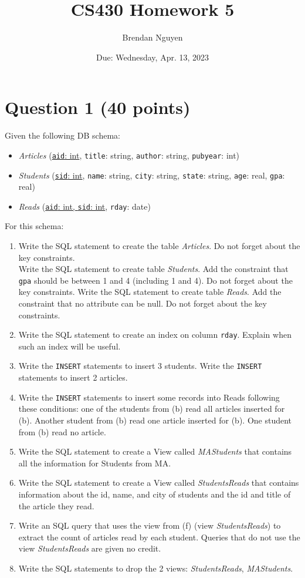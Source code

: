 \documentclass[letterpaper, 11pt]{article}
\title{CS430 Homework 5}
\author{Brendan Nguyen}
\date{Due: Wednesday, Apr. 13, 2023}
\begin{document}
\maketitle

\section*{Question 1 (40 points)}

Given the following DB schema:
\begin{itemize}
    \item \textit{Articles} (\underline{\texttt{aid}: int}, \texttt{title}: string, \texttt{author}: string, \texttt{pubyear}: int)
    \item \textit{Students} (\underline{\texttt{sid}: int}, \texttt{name}: string, \texttt{city}: string, \texttt{state}: string, \texttt{age}: real, \texttt{gpa}: real)
    \item \textit{Reads} (\underline{\texttt{aid}: int, \texttt{sid}: int}, \texttt{rday}: date)
\end{itemize}

For this schema:
\begin{enumerate}[label={\alph*})]
    \item Write the SQL statement to create the table \textit{Articles}. Do not forget about the key constraints.\\
    Write the SQL statement to create table \textit{Students}. Add the constraint that \texttt{gpa} should be between 1 and 4 (including 1 and 4). Do not forget about the key constraints. Write the SQL statement to create table \textit{Reads}. Add the constraint that no attribute can be null. Do not forget about the key constraints.
    \item Write the SQL statement to create an index on column \texttt{rday}. Explain when such an index will be useful.
    \item Write the \texttt{INSERT} statements to insert 3 students. Write the \texttt{INSERT} statements to insert 2 articles.
    \item Write the \texttt{INSERT} statements to insert some records into Reads following these conditions: one of the students from (b) read all articles inserted for (b). Another student from (b) read one article inserted for (b). One student from (b) read no article. 
    \item Write the SQL statement to create a View called \textit{MAStudents} that contains all the information for Students from MA.
    \item Write the SQL statement to create a View called \textit{StudentsReads} that contains information about the id, name, and city of students and the id and title of the article they read.
    \item Write an SQL query that uses the view from (f) (view \textit{StudentsReads}) to extract the count of articles read by each student. Queries that do not use the view \textit{StudentsReads} are given no credit.
    \item Write the SQL statements to drop the 2 views: \textit{StudentsReads}, \textit{MAStudents}.
\end{enumerate}
\end{document}
